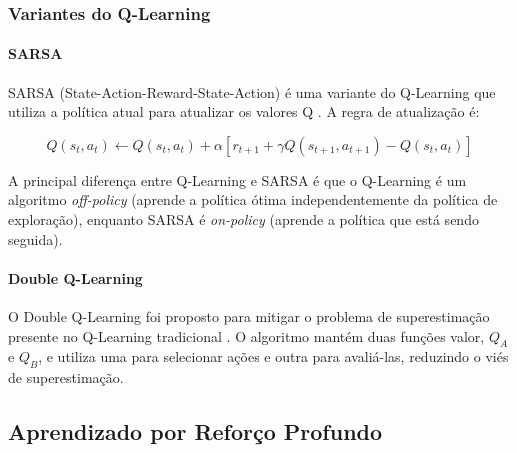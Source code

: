 \subsubsection{Variantes do Q-Learning}

\paragraph{SARSA}

SARSA (State-Action-Reward-State-Action) é uma variante do Q-Learning que utiliza a política atual para atualizar os valores Q \cite{Rummery1994}. A regra de atualização é:

\begin{equation}
Q(s_t, a_t) \leftarrow Q(s_t, a_t) + \alpha [r_{t+1} + \gamma Q(s_{t+1}, a_{t+1}) - Q(s_t, a_t)]
\end{equation}

A principal diferença entre Q-Learning e SARSA é que o Q-Learning é um algoritmo \textit{off-policy} (aprende a política ótima independentemente da política de exploração), enquanto SARSA é \textit{on-policy} (aprende a política que está sendo seguida).

\paragraph{Double Q-Learning}

O Double Q-Learning foi proposto para mitigar o problema de superestimação presente no Q-Learning tradicional \cite{Hasselt2010}. O algoritmo mantém duas funções valor, $Q_A$ e $Q_B$, e utiliza uma para selecionar ações e outra para avaliá-las, reduzindo o viés de superestimação.

\subsection{Aprendizado por Reforço Profundo}

